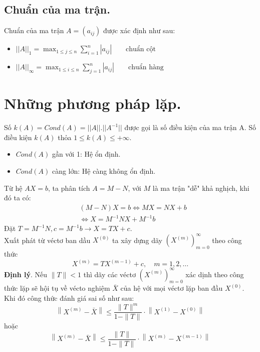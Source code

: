 \documentclass[12pt, a4paper]{report}
\begin{document}
\subsection{Chuẩn của ma trận.}
Chuẩn của ma trận $A=(a_{ij})$ được xác định như sau:
\begin{itemize}
    \item $||A||_1 = \displaystyle \max_{1\leq j \leq n} \sum_{i=1}^{n} |a_{ij}| \qquad \text{chuẩn cột}$
    \item $||A||_{\infty} = \displaystyle \max_{1\leq i \leq n} \sum_{j=1}^{n} |a_{ij}| \qquad \text{chuẩn hàng}$
\end{itemize}
\section{Những phương pháp lặp.}
Số $k(A)=Cond(A)=||A||.||A^{-1}||$ được gọi là số điều kiện của ma trận A. Số điều kiện $k(A)$ thỏa $1\leq k(A) \leq +\infty$.
\begin{itemize}
    \item $Cond(A)$ gần với 1: Hệ ổn định.
    \item $Cond(A)$ càng lớn: Hệ càng không ổn định.
\end{itemize}
Từ hệ $A X=b$, ta phân tích $A=M-N$, với $M$ là ma trận "dễ" khả nghịch, khi đó ta có:
\[
    \begin{aligned}
        & (M-N) X=b \Leftrightarrow M X=N X+b \\
        & \Leftrightarrow X=M^{-1} N X+M^{-1} b
    \end{aligned}
\]
Đặt $T=M^{-1} N, c=M^{-1} b \rightarrow X=T X+c$.\\
Xuất phát từ véctơ ban dầu $X^{(0)}$ ta xây dựng dãy $\left(X^{(m)}\right)_{m=0}^{\infty}$ theo công thức
\[
    X^{(m)}=T X^{(m-1)}+c, \quad m=1,2, \ldots
\]
\textbf{Định lý}. Nếu $\|T\|<1$ thì dãy các véctơ $\left(X^{(m)}\right)_{m=0}^{\infty}$ xác dịnh theo công thức lặp sẽ hội tụ về vécto nghiệm $\bar{X}$ của hệ với mọi véctơ lặp ban đầu $X^{(0)}$. Khi đó công thức đánh giá sai số như sau:
\[
    \left\|X^{(m)}-\bar{X}\right\| \leqslant \frac{\|T\|^m}{1-\|T\|} \cdot\left\|X^{(1)}-X^{(0)}\right\|
\]
hoặc
\[
    \left\|X^{(m)}-\bar{X}\right\| \leqslant \frac{\|T\|}{1-\|T\|} \cdot\left\|X^{(m)}-X^{(m-1)}\right\|
\]
\newpage
\end{document}
